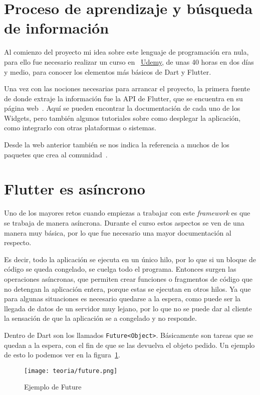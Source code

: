 \section{Proceso de aprendizaje y búsqueda de información}
Al comienzo del proyecto mi idea sobre este lenguaje de programación era nula, para ello fue necesario realizar un curso en ~\href{https://www.udemy.com/course/flutter-primeros-pasos/}{Udemy}, de unas 40 horas en dos días y medio, para conocer los elementos más básicos de Dart y Flutter.

Una vez con las nociones necesarias para arrancar el proyecto, la primera fuente de donde extraje la información fue la API de Flutter, que se encuentra en su página web~\cite{google:apiflutter}. Aquí se pueden encontrar la documentación de cada uno de los Widgets, pero también algunos tutoriales sobre como desplegar la aplicación, como integrarlo con otras plataformas o sistemas.

Desde la web anterior también se nos indica la referencia a muchos de los paquetes que crea al comunidad~\cite{google:pubdev}.


\section{Flutter es asíncrono}
Uno de los mayores retos cuando empiezas a trabajar con este \emph{framework} es que se trabaja de manera asíncrona. Durante el curso estos aspectos se ven de una manera muy básica, por lo que fue necesario una mayor documentación al respecto.

Es decir, todo la aplicación se ejecuta en un único hilo, por lo que si un bloque de código se queda congelado, se cuelga todo el programa. Entonces surgen las operaciones asíncronas, que permiten crear funciones o fragmentos de código que no detengan la aplicación entera, porque estas se ejecutan en otros hilos. Ya que para algunas situaciones es necesario quedarse a la espera, como puede ser la llegada de datos de un servidor muy lejano, por lo que no se puede dar al cliente la sensación de que la aplicación se a congelado y no responde.

Dentro de Dart son los llamados \verb|Future<Object>|. Básicamente son tareas que se quedan a la espera, con el fin de que se las devuelva el objeto pedido. Un ejemplo de esto lo podemos ver en la figura~\ref{fig:future}.

\begin{figure}[H]
	\centering
	\texttt{[image: teoria/future.png]}
	\caption{Ejemplo de Future}\label{fig:future}
\end{figure}

